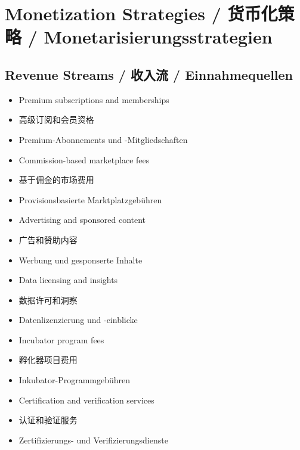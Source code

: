 \section{Monetization Strategies / 货币化策略 / Monetarisierungsstrategien}

\subsection{Revenue Streams / 收入流 / Einnahmequellen}
\begin{itemize}
    \item Premium subscriptions and memberships
    \item 高级订阅和会员资格
    \item Premium-Abonnements und -Mitgliedschaften
    \item Commission-based marketplace fees
    \item 基于佣金的市场费用
    \item Provisionsbasierte Marktplatzgebühren
    \item Advertising and sponsored content
    \item 广告和赞助内容
    \item Werbung und gesponserte Inhalte
    \item Data licensing and insights
    \item 数据许可和洞察
    \item Datenlizenzierung und -einblicke
    \item Incubator program fees
    \item 孵化器项目费用
    \item Inkubator-Programmgebühren
    \item Certification and verification services
    \item 认证和验证服务
    \item Zertifizierungs- und Verifizierungsdienste
\end{itemize}

